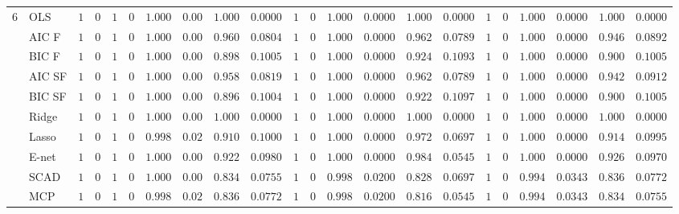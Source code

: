 \begin{tabular}{ll|ll|llllll|llllll|llllll}
6 & OLS  & $1$ & $0$ & $1$ & $0$ & $1.000$ & $0.00$ & $1.000$ & $0.0000$ & $1$ & $0$ & $1.000$ & $0.0000$ & $1.000$ & $0.0000$ & $1$ & $0$ & $1.000$ & $0.0000$ & $1.000$ & $0.0000$ \\
 & AIC F  & $1$ & $0$ & $1$ & $0$ & $1.000$ & $0.00$ & $0.960$ & $0.0804$ & $1$ & $0$ & $1.000$ & $0.0000$ & $0.962$ & $0.0789$ & $1$ & $0$ & $1.000$ & $0.0000$ & $0.946$ & $0.0892$ \\
 & BIC F  & $1$ & $0$ & $1$ & $0$ & $1.000$ & $0.00$ & $0.898$ & $0.1005$ & $1$ & $0$ & $1.000$ & $0.0000$ & $0.924$ & $0.1093$ & $1$ & $0$ & $1.000$ & $0.0000$ & $0.900$ & $0.1005$ \\
 & AIC SF  & $1$ & $0$ & $1$ & $0$ & $1.000$ & $0.00$ & $0.958$ & $0.0819$ & $1$ & $0$ & $1.000$ & $0.0000$ & $0.962$ & $0.0789$ & $1$ & $0$ & $1.000$ & $0.0000$ & $0.942$ & $0.0912$ \\
 & BIC SF  & $1$ & $0$ & $1$ & $0$ & $1.000$ & $0.00$ & $0.896$ & $0.1004$ & $1$ & $0$ & $1.000$ & $0.0000$ & $0.922$ & $0.1097$ & $1$ & $0$ & $1.000$ & $0.0000$ & $0.900$ & $0.1005$ \\
 & Ridge  & $1$ & $0$ & $1$ & $0$ & $1.000$ & $0.00$ & $1.000$ & $0.0000$ & $1$ & $0$ & $1.000$ & $0.0000$ & $1.000$ & $0.0000$ & $1$ & $0$ & $1.000$ & $0.0000$ & $1.000$ & $0.0000$ \\
 & Lasso  & $1$ & $0$ & $1$ & $0$ & $0.998$ & $0.02$ & $0.910$ & $0.1000$ & $1$ & $0$ & $1.000$ & $0.0000$ & $0.972$ & $0.0697$ & $1$ & $0$ & $1.000$ & $0.0000$ & $0.914$ & $0.0995$ \\
 & E-net  & $1$ & $0$ & $1$ & $0$ & $1.000$ & $0.00$ & $0.922$ & $0.0980$ & $1$ & $0$ & $1.000$ & $0.0000$ & $0.984$ & $0.0545$ & $1$ & $0$ & $1.000$ & $0.0000$ & $0.926$ & $0.0970$ \\
 & SCAD  & $1$ & $0$ & $1$ & $0$ & $1.000$ & $0.00$ & $0.834$ & $0.0755$ & $1$ & $0$ & $0.998$ & $0.0200$ & $0.828$ & $0.0697$ & $1$ & $0$ & $0.994$ & $0.0343$ & $0.836$ & $0.0772$ \\
 & MCP  & $1$ & $0$ & $1$ & $0$ & $0.998$ & $0.02$ & $0.836$ & $0.0772$ & $1$ & $0$ & $0.998$ & $0.0200$ & $0.816$ & $0.0545$ & $1$ & $0$ & $0.994$ & $0.0343$ & $0.834$ & $0.0755$ \\
\hline 
\end{tabular}

